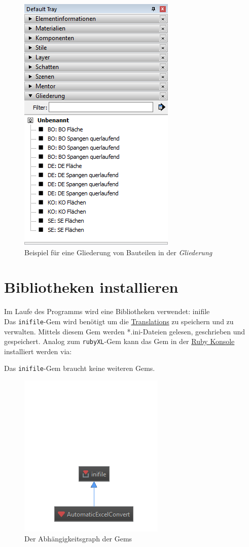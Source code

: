 \documentclass{book}
\newcommand{\rubyXL}{\texttt{rubyXL}\xspace}
\newcommand{\inifile}{\texttt{inifile}\xspace}
\begin{document}
			\begin{figure}[H]
				\centering
				\includegraphics[scale=0.6]{pics/Gliederung-Beispiel.png}
				\caption{Beispiel für eine Gliederung von Bauteilen in der \textit{Gliederung}}
				\label{Gliederung Beispiel}
			\end{figure}
			
		\section{Bibliotheken installieren} \label{Installation}
			Im Laufe des Programms wird eine Bibliotheken verwendet: inifile\\\label{inifile}
				Das \inifile-Gem wird benötigt um die \hyperref[Translations]{Translations} zu speichern und zu verwalten. Mittels diesem Gem werden *.ini-Dateien gelesen, geschrieben und gespeichert. Analog zum \rubyXL-Gem kann das Gem in der \hyperref[Ruby Konsole]{Ruby Konsole} installiert werden via:
				
				Das \inifile-Gem braucht keine weiteren Gems.
			\begin{figure}[H]
				\centering
				\includegraphics[scale=0.6]{pics/Gemdependency-full.png}
				\caption{Der Abhängigkeitsgraph der Gems}
				\label{Abhaengigkeitsgraph}
			\end{figure}
\end{document}
